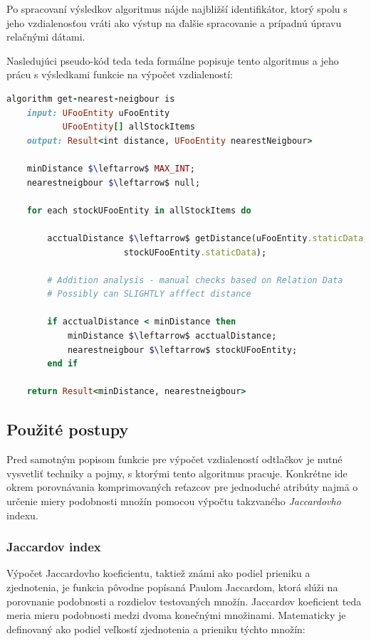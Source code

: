 \documentclass[
  digital, %
  table,   %
  lof,     %
  nolot,   %
  nocover
]{fithesis3}
\begin{document}
Po spracovaní
výsledkov algoritmus nájde najbližší identifikátor, ktorý spolu s jeho
vzdialenosťou vráti ako výstup na ďalšie spracovanie a prípadnú úpravu
relačnými dátami.

Nasledujúci pseudo-kód teda teda formálne popisuje tento algoritmus a jeho prácu s
výsledkami funkcie na výpočet vzdialeností:
\begin{lstlisting}[basicstyle=\footnotesize, language=Ruby, mathescape]
algorithm get-nearest-neigbour is
    input: UFooEntity uFooEntity
           UFooEntity[] allStockItems
    output: Result<int distance, UFooEntity nearestNeigbour>

    minDistance $\leftarrow$ MAX_INT;
    nearestneigbour $\leftarrow$ null;

    for each stockUFooEntity in allStockItems do

        acctualDistance $\leftarrow$ getDistance(uFooEntity.staticData,
                       stockUFooEntity.staticData);

        # Addition analysis - manual checks based on Relation Data
        # Possibly can SLIGHTLY afffect distance 

        if acctualDistance < minDistance then
            minDistance $\leftarrow$ acctualDistance;
            nearestneigbour $\leftarrow$ stockUFooEntity;
        end if
    
    return Result<minDistance, nearestneigbour>
\end{lstlisting}

\subsection{Použité postupy}
Pred samotným popisom funkcie pre výpočet vzdialeností odtlačkov je nutné
vysvetliť techniky a pojmy, s ktorými tento algoritmus pracuje. Konkrétne ide
okrem porovnávania komprimovaných reťazcov pre jednoduché atribúty najmä o 
určenie miery podobnosti množín pomocou výpočtu takzvaného
\textit{Jaccardovho} indexu.

\subsubsection{Jaccardov index}
Výpočet Jaccardovho koeficientu, taktiež známi ako podiel prieniku a 
zjednotenia, je funkcia pôvodne popísaná Paulom Jaccardom, ktorá slúži na
porovnanie podobnosti a rozdielov testovaných množín. Jaccardov koeficient teda
meria mieru podobnosti medzi dvoma konečnými množinami. Matematicky je
definovaný ako podiel veľkostí zjednotenia a prieniku týchto množín:
\end{document}
